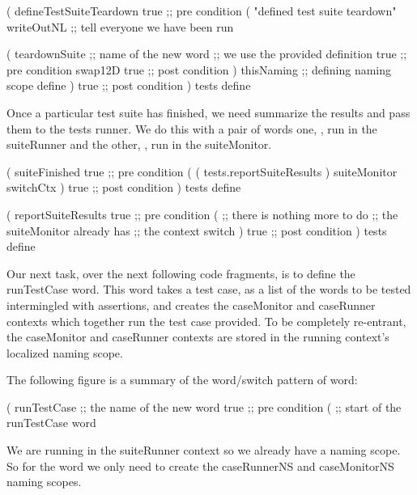 \startJoylolCode
(
  defineTestSuiteTeardown
  { true } ;; pre condition
  (
    "defined test suite teardown"
    writeOutNL    ;; tell everyone we have been run

    (
      teardownSuite ;; name of the new word
                    ;; we use the provided definition
      { true }      ;; pre condition
      swap12D
      { true }      ;; post condition
    )
    thisNaming      ;; defining naming scope
    define
  )
  { true }        ;; post condition
)
tests
define
\stopJoylolCode

Once a particular test suite has finished, we need summarize the results 
and pass them to the tests runner. We do this with a pair of words one, 
, run in the suiteRunner and the other, 
, run in the suiteMonitor. 

\startJoylolCode
(
  suiteFinished
  { true }   ;; pre condition
  (
    ( tests.reportSuiteResults )
    suiteMonitor
    switchCtx
  )
  { true } ;; post condition
)
tests
define
\stopJoylolCode

\startJoylolCode
( 
  reportSuiteResults
  { true }  ;; pre condition
  (
            ;; there is nothing more to do
            ;; the suiteMonitor already has
            ;; the context switch 
  )
  { true }  ;; post condition
)
tests
define
\stopJoylolCode

\stopTestSuite

\startTestSuite[runTestCase]

Our next task, over the next following code fragments, is to define the 
runTestCase word. This word takes a test case, as a list of the words to 
be tested intermingled with assertions, and creates the caseMonitor and 
caseRunner contexts which together run the test case provided. To be 
completely re-entrant, the caseMonitor and caseRunner contexts are stored 
in the running context's localized naming scope. 

The following figure is a summary of the word/switch pattern of 
 word: 


\startJoylolCode
( 
  runTestCase   ;; the name of the new word
  { true }      ;; pre condition
  (             ;; start of the runTestCase word
\stopJoylolCode

We are running in the suiteRunner context so we already have a 
 naming scope. So for the  word we only 
need to create the caseRunnerNS and caseMonitorNS naming scopes. 

